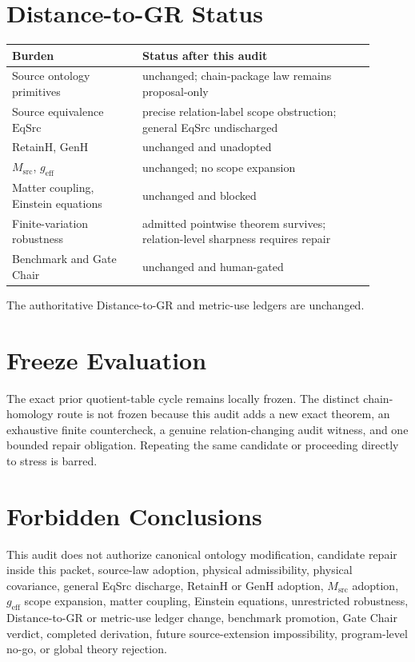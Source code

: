 \documentclass[11pt]{article}
\begin{document}
\section{Distance-to-GR Status}

\begin{center}
\begin{tabular}{p{0.32\linewidth}p{0.58\linewidth}}
\toprule
Burden & Status after this audit\\
\midrule
Source ontology primitives & unchanged; chain-package law remains proposal-only\\
Source equivalence \(\mathrm{EqSrc}\) & precise relation-label scope obstruction; general EqSrc undischarged\\
RetainH, GenH & unchanged and unadopted\\
\(M_{\mathrm{src}}\), \(g_{\mathrm{eff}}\) & unchanged; no scope expansion\\
Matter coupling, Einstein equations & unchanged and blocked\\
Finite-variation robustness & admitted pointwise theorem survives; relation-level sharpness requires repair\\
Benchmark and Gate Chair & unchanged and human-gated\\
\bottomrule
\end{tabular}
\end{center}

The authoritative Distance-to-GR and metric-use ledgers are unchanged.

\section{Freeze Evaluation}

The exact prior quotient-table cycle remains locally frozen. The distinct
chain-homology route is not frozen because this audit adds a new exact theorem,
an exhaustive finite countercheck, a genuine relation-changing audit witness,
and one bounded repair obligation. Repeating the same candidate or proceeding
directly to stress is barred.

\section{Forbidden Conclusions}

This audit does not authorize canonical ontology modification, candidate
repair inside this packet, source-law adoption, physical admissibility,
physical covariance, general EqSrc discharge, RetainH or GenH adoption,
\(M_{\mathrm{src}}\) adoption, \(g_{\mathrm{eff}}\) scope expansion, matter
coupling, Einstein equations, unrestricted robustness, Distance-to-GR or
metric-use ledger change, benchmark promotion, Gate Chair verdict, completed
derivation, future source-extension impossibility, program-level no-go, or
global theory rejection.
\end{document}
